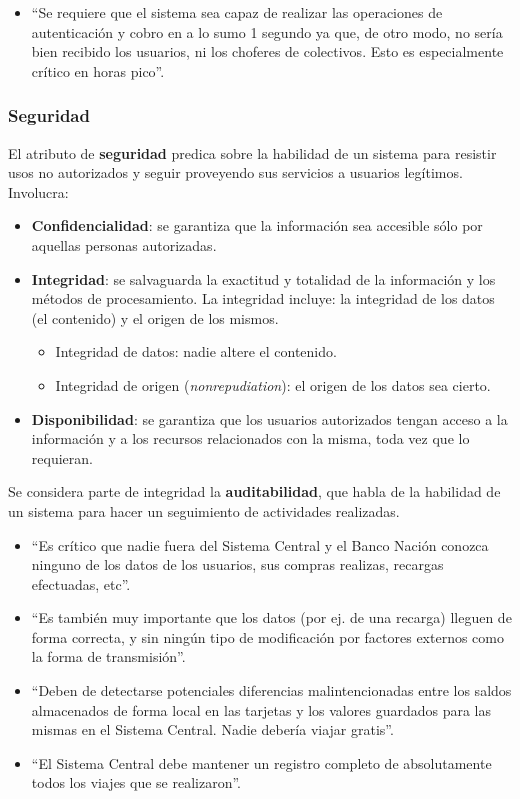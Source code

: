 \documentclass[]{article}
\begin{document}
\begin{itemize}
	\item ``Se requiere que el sistema sea capaz de realizar las operaciones de autenticación y cobro en a lo sumo 1 segundo ya que, de otro modo, no sería bien recibido los usuarios, ni los choferes de colectivos. Esto es especialmente crítico en horas pico''.
\end{itemize}

\subsubsection{Seguridad}
El atributo de \textbf{seguridad} predica sobre la habilidad de un sistema para resistir usos no autorizados y seguir proveyendo sus servicios a usuarios legítimos. Involucra:

\begin{itemize}
	\item \textbf{Confidencialidad}: se garantiza que la información sea accesible sólo por aquellas personas autorizadas.
	\item \textbf{Integridad}: se salvaguarda la exactitud y totalidad de la información y los métodos de procesamiento. La integridad incluye: la integridad de los datos (el contenido) y el origen de los mismos.
	\begin{itemize}
		\item Integridad de datos: nadie altere el contenido.
		\item Integridad de origen (\emph{nonrepudiation}): el origen de los datos sea cierto.
	\end{itemize}
	\item \textbf{Disponibilidad}: se garantiza que los usuarios autorizados tengan acceso a la información y a los recursos relacionados con la misma, toda vez que lo requieran.
\end{itemize}

Se considera parte de integridad la \textbf{auditabilidad}, que habla de la habilidad de un sistema para hacer un seguimiento de actividades realizadas.

\begin{itemize}
	\item ``Es crítico que nadie fuera del Sistema Central y el Banco Nación conozca ninguno de los datos de los usuarios, sus compras realizas, recargas efectuadas, etc''.
	\item ``Es también muy importante que los datos (por ej. de una recarga) lleguen de forma correcta, y sin ningún tipo de modificación por factores externos como la forma de transmisión''.
	\item ``Deben de detectarse potenciales diferencias malintencionadas entre los saldos almacenados de forma local en las tarjetas y los valores guardados para las mismas en el Sistema Central. Nadie debería viajar gratis''.
	\item ``El Sistema Central debe mantener un registro completo de absolutamente todos los viajes que se realizaron''.
\end{itemize}
\end{document}
